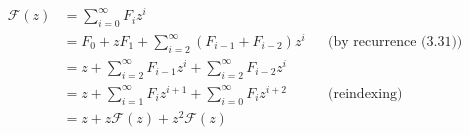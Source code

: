 \begin{align*}
    \mathcal{F}(z) &= \sum_{i=0}^\infty F_iz^i \\
    &= F_0+zF_1+\sum_{i=2}^\infty(F_{i-1}+F_{i-2})z^i && \text{(by recurrence (3.31))} \\
    &= z+\sum_{i=2}^\infty F_{i-1}z^i+\sum_{i=2}^\infty F_{i-2}z^i \\
    &= z+\sum_{i=1}^\infty F_iz^{i+1}+\sum_{i=0}^\infty F_iz^{i+2} && \text{(reindexing)} \\[1mm]
    &= z+z\mathcal{F}(z)+z^2\mathcal{F}(z)
\end{align*}
